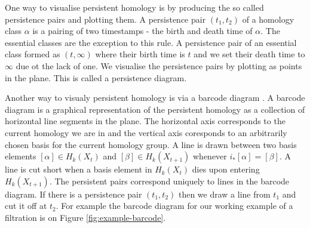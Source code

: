 
One way to visualise persistent homology is by producing the so called persistence pairs and plotting them. A persistence pair $(t_1, t_2)$ of a homology class $\alpha$ is a pairing of two timestamps - the birth and death time of $\alpha$. The essential classes are the exception to this rule. A persistence pair of an essential class formed as $(t, \infty)$ where their birth time is $t$ and we set their death time to $\infty$ due ot the lack of one. We visualise the persistence pairs by plotting as points in the plane. This is called a persistence diagram.

Another way to visualy persistent homology is via a barcode diagram \cite{barcodes}. A barcode diagram is a graphical representation of the persistent homology as a collection of horizontal line segments in the plane. The horizontal axis corresponds to the current homology we are in and the vertical axis coresponds to an arbitrarily chosen basis for the current homology group. A line is drawn between two basis elements $[\alpha] \in H_k(X_t)$ and $[\beta] \in H_k(X_{t+1})$ whenever $i_*[\alpha] = [\beta]$. A line is cut short when a basis element in $H_k(X_t)$ dies upon entering $H_k(X_{t+1})$. The persistent pairs correspond uniquely to lines in the barcode diagram. If there is a persistence pair $(t_1, t_2)$ then we draw a line from $t_1$ and cut it off at $t_2$. For example the barcode diagram for our working example of a filtration is on Figure \ref{fig:example-barcode}.

